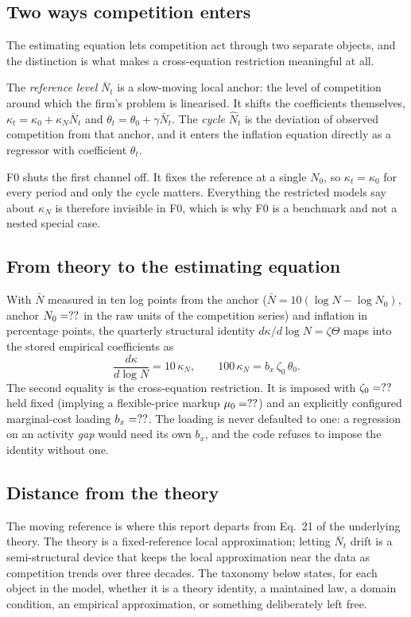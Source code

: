 \documentclass[11pt]{article}
\newcommand{\kt}{\kappa_t}
\newcommand{\Nbar}{\bar N}
\newcommand{\Nhat}{\hat N}
\begin{document}
\subsection{Two ways competition enters}
The estimating equation lets competition act through two separate objects, and
the distinction is what makes a cross-equation restriction meaningful at all.

The \emph{reference level} $\Nbar_t$ is a slow-moving local anchor: the level of
competition around which the firm's problem is linearised. It shifts the
coefficients themselves, $\kt=\kappa_0+\kappa_N\Nbar_t$ and
$\theta_t=\theta_0+\gamma\Nbar_t$. The \emph{cycle} $\Nhat_t$ is the deviation
of observed competition from that anchor, and it enters the inflation equation
directly as a regressor with coefficient $\theta_t$.

F0 shuts the first channel off. It fixes the reference at a single $N_0$, so
$\kt=\kappa_0$ for every period and only the cycle matters. Everything the
restricted models say about $\kappa_N$ is therefore invisible in F0, which is
why F0 is a benchmark and not a nested special case.

\subsection{From theory to the estimating equation}
With $\Nbar$ measured in ten log points from the anchor
($\Nbar=10(\log N-\log N_0)$, anchor $N_0=??$ in the raw units
of the competition series) and inflation in percentage points, the quarterly
structural identity $d\kappa/d\log N=\zeta\Theta$ maps into the stored
empirical coefficients as
\[
  \frac{d\kappa}{d\log N}=10\,\kappa_N,
  \qquad
  100\,\kappa_N=b_x\,\zeta_0\,\theta_0 .
\]
The second equality is the cross-equation restriction. It is imposed with
$\zeta_0=??$ held fixed (implying a flexible-price markup
$\mu_0=??$) and an explicitly configured marginal-cost loading
$b_x=??$. The loading is never defaulted to one: a
regression on an activity \emph{gap} would need its own $b_x$, and the code
refuses to impose the identity without one.

\subsection{Distance from the theory}
The moving reference is where this report departs from Eq.~21 of the underlying
theory. The theory is a fixed-reference local approximation; letting $\Nbar_t$
drift is a semi-structural device that keeps the local approximation near the
data as competition trends over three decades. The taxonomy below states, for
each object in the model, whether it is a theory identity, a maintained law, a
domain condition, an empirical approximation, or something deliberately left
free.
\end{document}
